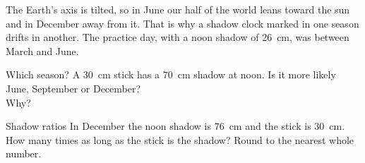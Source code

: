 \begin{center}
\end{center}

The Earth's axis is tilted, so in June our half of the world leans toward the sun and in December away from it. That is why a shadow clock marked in one season drifts in another. The practice day, with a noon shadow of 26~cm, was between March and June.

\begin{puzzle}{Which season?}
A 30~cm stick has a 70~cm shadow at noon. Is it more likely June, September or December? \wline[2cm]\\
Why? \wline[5cm]
\end{puzzle}

\begin{puzzle}{Shadow ratios}
In December the noon shadow is 76~cm and the stick is 30~cm. How many times as long as the stick is the shadow? \wline[1.6cm] Round to the nearest whole number.
\end{puzzle}
\clearpage
